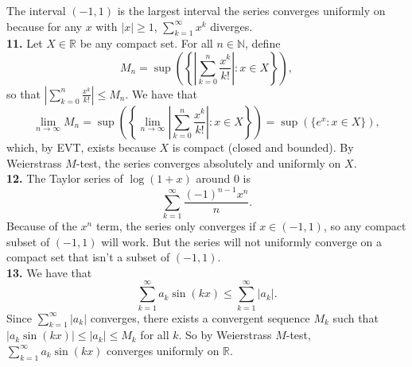 \documentclass{article}
\newcommand{\R}{\mathbb{R}}
\newcommand{\N}{\mathbb{N}}
\begin{document}
The interval $(-1, 1)$ is the largest interval the series converges uniformly on because for any $x$ with $|x| \ge 1$, $\sum_{k = 1}^\infty x^k$ diverges. \\

\textbf{11.} Let $X \in \R$ be any compact set. For all $n \in \N$, define
$$M_n = \sup\left(\left\{\left|\sum_{k = 0}^n \frac{x^k}{k!}\right| : x \in X\right\}\right),$$
so that $\left|\sum_{k = 0}^n \frac{x^k}{k!}\right| \le M_n$. We have that
$$\lim_{n\to \infty} M_n = \sup\left(\left\{\lim_{n\to\infty}\left|\sum_{k = 0}^n \frac{x^k}{k!}\right| : x \in X\right\}\right) = \sup(\{e^x : x \in X\}),$$
which, by EVT, exists because $X$ is compact (closed and bounded). By Weierstrass $M$-test, the series converges absolutely and uniformly on $X$. \\

\textbf{12.} The Taylor series of $\log(1 + x)$ around $0$ is
$$\sum_{k = 1}^\infty \frac{(-1)^{n - 1}x^n}{n}.$$
Because of the $x^n$ term, the series only converges if $x \in (-1, 1)$, so any compact subset of $(-1, 1)$ will work. But the series will not uniformly converge on a compact set that isn't a subset of $(-1, 1)$. \\

\textbf{13.} We have that
$$\sum_{k = 1}^\infty a_k\sin(kx) \le \sum_{k = 1}^\infty |a_k|.$$
Since $\sum_{k = 1}^\infty |a_k|$ converges, there exists 
a convergent sequence $M_k$ such that $|a_k\sin(kx)| \le |a_k| \le M_k$ for all $k$. So by Weierstrass $M$-test, $\sum_{k = 1}^\infty a_k\sin(kx)$ converges uniformly on $\R$.
\end{document}
